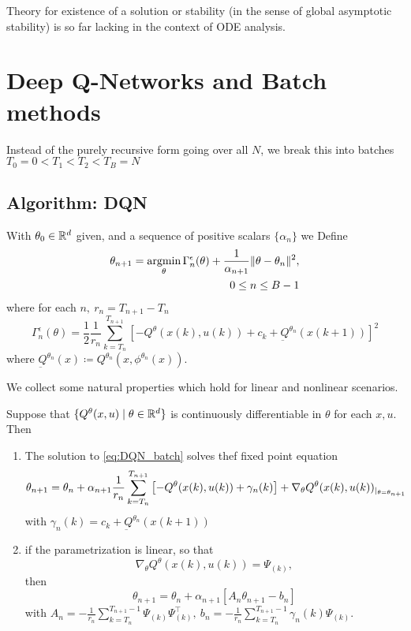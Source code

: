 Theory for existence of a solution or stability (in the sense of global asymptotic stability)
is so far lacking in the context of ODE analysis.

\section{Deep Q-Networks and Batch methods}
Instead of the purely recursive form going over all 
\(N\), we break this into batches  \(T_0=0<T_1<T_2<T_B=N\)

\subsection{Algorithm: DQN}
With \(\theta_0\in \mathbb{R}^d\) given, and a sequence of positive scalars \(\{\alpha_n\}\) we Define
\begin{eqnarray}\label{eq:DQN_batch}
    \theta_{n+1}=\operatorname*{\text{argmin}}_{\theta}\Gamma_n^\epsilon(\theta)+\frac{1}{\alpha_{n+1}}\Vert \theta-\theta_n\Vert^2,\\ 0\leq n\leq B-1
\end{eqnarray}
where for each \(n,\ r_n=T_{n+1}-T_n\)
\[\Gamma_n^\epsilon(\theta)=\frac{1}{2}\frac{1}{r_n}\sum_{k=T_n}^{T_{n+1}}\left[-Q^\theta(x(k),u(k))+c_k+\underbar{Q}^{\theta_n}(x(k+1))\right]^2\]
where \(\underbar{Q}^{\theta_n}(x)\coloneqq Q^{\theta_n}(x,\phi^{\theta_n}(x))\).

We collect some natural properties which hold for linear and nonlinear scenarios.
\begin{proposition}\label{prop:51}
    Suppose that \(\{Q^\theta(x,u)\mid \theta\in \mathbb{R}^d\}\) is continuously differentiable in \(\theta\)
    for each \(x,u\). Then 
    \begin{enumerate}
        \item The solution to \ref{eq:DQN_batch} solves thef fixed point equation \[\theta_{n+1}=\theta_n+\alpha_{n+1}\frac{1}{r_n}\sum_{k=T_n}^{T_{n+1}}\left[-Q^\theta(x(k),u(k))+\gamma_n(k)\right]+\nabla_\theta Q^\theta(x(k),u(k))_{|_{\theta=\theta_{n+1}}}\] with \(\gamma_n(k)=c_k+\underbar{Q}^{\theta_n}(x(k+1))\)
        \item if the parametrization is linear, so that \[\nabla_\theta Q^\theta(x(k),u(k))=\Psi_{(k)},\] then \[\theta_{n+1}=\theta_n+\alpha_{n+1}\left[A_n\theta_{n+1}-b_n\right]\] with \(A_n=-\frac{1}{r_n}\sum_{k=T_n}^{T_{n+1}-1}\Psi_{(k)}\Psi_{(k)}^\intercal,\ b_n=-\frac{1}{r_n}\sum_{k=T_n}^{T_{n+1}-1}\gamma_n(k)\Psi_{(k)}\). 
    \end{enumerate}
\end{proposition}

